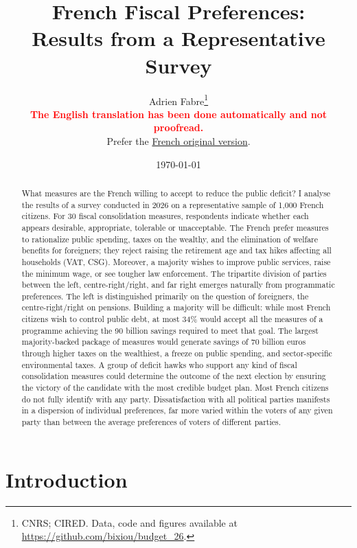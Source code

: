 \documentclass[12pt,english]{article}
\title{
  French Fiscal Preferences:\\ Results from a Representative Survey
}
\author{Adrien Fabre\thanks{CNRS; CIRED. Data, code and figures available at
\url{https://github.com/bixiou/budget_26}.} \\
\textcolor{red}{\textbf{The English translation has been done automatically and not proofread.}} \\
Prefer the \href{https://github.com/bixiou/budget_26/raw/main/papers/budget.pdf}{French original version}.}
\date{\today}
\begin{document}
\maketitle


\begin{abstract}
What measures are the French willing to accept to reduce the public deficit? I analyse the results of a survey conducted in 2026 on a representative sample of 1,000 French citizens. For 30 fiscal consolidation measures, respondents indicate whether each appears desirable, appropriate, tolerable or unacceptable. The French prefer measures to rationalize public spending, taxes on the wealthy, and the elimination of welfare benefits for foreigners; they reject raising the retirement age and tax hikes affecting all households (VAT, CSG). Moreover, a majority wishes to improve public services, raise the minimum wage, or see tougher law enforcement. The tripartite division of parties between the left, centre-right/right, and far right emerges naturally from programmatic preferences. The left is distinguished primarily on the question of foreigners, the centre-right/right on pensions. Building a majority will be difficult: while most French citizens wish to control public debt, at most 34\% would accept all the measures of a programme achieving the 90 billion savings required to meet that goal. The largest majority-backed package of measures would generate savings of 70 billion euros through higher taxes on the wealthiest, a freeze on public spending, and sector-specific environmental taxes. A group of deficit hawks who support any kind of fiscal consolidation measures could determine the outcome of the next election by ensuring the victory of the candidate with the most credible budget plan. Most French citizens do not fully identify with any party.
Dissatisfaction with all political parties manifests in a dispersion of individual preferences, far more varied within the voters of any given party than between the average preferences of voters of different parties.
\end{abstract}

\clearpage
\tableofcontents
\newpage

\section*{Introduction}
\label{sec:intro}
\end{document}

